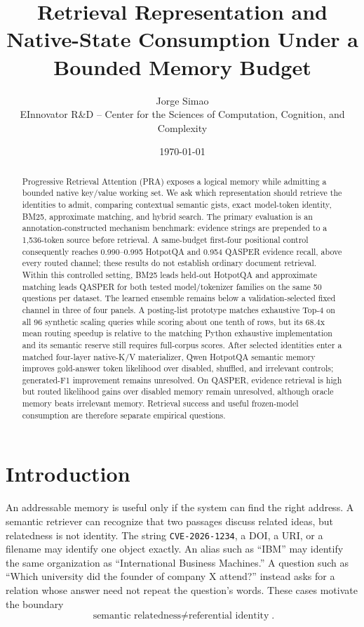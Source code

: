 \documentclass[11pt]{article}
\title{Retrieval Representation and Native-State Consumption Under a Bounded Memory Budget}
\author{Jorge Simao\\EInnovator R\&D -- Center for the Sciences of Computation, Cognition, and Complexity}
\date{\today}
\begin{document}
\maketitle

\begin{abstract}
Progressive Retrieval Attention (PRA) exposes a logical memory while admitting a bounded native key/value working set. We ask which representation should retrieve the identities to admit, comparing contextual semantic gists, exact model-token identity, BM25, approximate matching, and hybrid search. The primary evaluation is an annotation-constructed mechanism benchmark: evidence strings are prepended to a 1,536-token source before retrieval. A same-budget first-four positional control consequently reaches 0.990--0.995 HotpotQA and 0.954 QASPER evidence recall, above every routed channel; these results do not establish ordinary document retrieval. Within this controlled setting, BM25 leads held-out HotpotQA and approximate matching leads QASPER for both tested model/tokenizer families on the same 50 questions per dataset. The learned ensemble remains below a validation-selected fixed channel in three of four panels. A posting-list prototype matches exhaustive Top-4 on all 96 synthetic scaling queries while scoring about one tenth of rows, but its 68.4x mean routing speedup is relative to the matching Python exhaustive implementation and its semantic reserve still requires full-corpus scores. After selected identities enter a matched four-layer native-K/V materializer, Qwen HotpotQA semantic memory improves gold-answer token likelihood over disabled, shuffled, and irrelevant controls; generated-F1 improvement remains unresolved. On QASPER, evidence retrieval is high but routed likelihood gains over disabled memory remain unresolved, although oracle memory beats irrelevant memory. Retrieval success and useful frozen-model consumption are therefore separate empirical questions.
\end{abstract}

\section{Introduction}
An addressable memory is useful only if the system can find the right address. A semantic retriever can recognize that two passages discuss related ideas, but relatedness is not identity. The string \texttt{CVE-2026-1234}, a DOI, a URI, or a filename may identify one object exactly. An alias such as ``IBM'' may identify the same organization as ``International Business Machines.'' A question such as ``Which university did the founder of company X attend?'' instead asks for a relation whose answer need not repeat the question's words. These cases motivate the boundary
\[
\boxed{\text{semantic relatedness}\neq\text{referential identity}}.
\]
\end{document}
